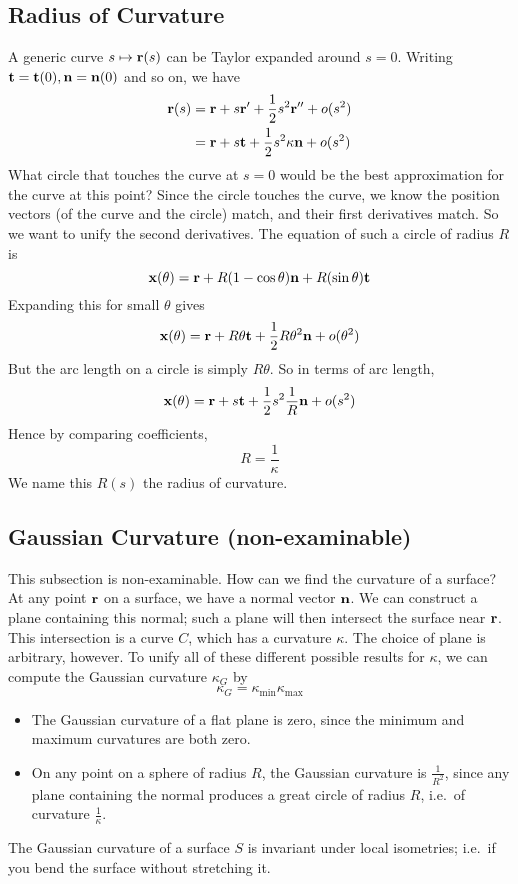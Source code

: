 \subsection{Radius of Curvature}
A generic curve \(s \mapsto \vb r(s)\) can be Taylor expanded around \(s=0\). Writing \(\vb t = \vb t(0), \vb n = \vb n(0)\) and so on, we have
\begin{align*}
	\vb r(s) & = \vb r + s\vb r' + \frac{1}{2}s^2 \vb r'' + o(s^2)    \\
	         & = \vb r + s\vb t + \frac{1}{2}s^2 \kappa\vb n + o(s^2)
\end{align*}
What circle that touches the curve at \(s=0\) would be the best approximation for the curve at this point? Since the circle touches the curve, we know the position vectors (of the curve and the circle) match, and their first derivatives match. So we want to unify the second derivatives. The equation of such a circle of radius \(R\) is
\[ \vb x(\theta) = \vb r + R(1 - \cos \theta)\vb n + R(\sin \theta) \vb t \]
Expanding this for small \(\theta\) gives
\[ \vb x(\theta) = \vb r + R\theta\vb t + \frac{1}{2} R\theta^2\vb n + o(\theta^2) \]
But the arc length on a circle is simply \(R\theta\). So in terms of arc length,
\[ \vb x(\theta) = \vb r + s\vb t + \frac{1}{2} s^2 \frac{1}{R}\vb n + o(s^2) \]
Hence by comparing coefficients,
\[ R = \frac{1}{\kappa} \]
We name this \(R(s)\) the radius of curvature.

\subsection{Gaussian Curvature (non-examinable)}
This subsection is non-examinable. How can we find the curvature of a surface? At any point \(\vb r\) on a surface, we have a normal vector \(\vb n\). We can construct a plane containing this normal; such a plane will then intersect the surface near \(\vb r\). This intersection is a curve \(C\), which has a curvature \(\kappa\). The choice of plane is arbitrary, however. To unify all of these different possible results for \(\kappa\), we can compute the Gaussian curvature \(\kappa_G\) by
\[ \kappa_G = \kappa_{\text{min}} \kappa_{\text{max}} \]
\begin{itemize}
	\item The Gaussian curvature of a flat plane is zero, since the minimum and maximum curvatures are both zero.
	\item On any point on a sphere of radius \(R\), the Gaussian curvature is \(\frac{1}{R^2}\), since any plane containing the normal produces a great circle of radius \(R\), i.e.\ of curvature \(\frac{1}{\kappa}\).
\end{itemize}

\begin{theorem}
	The Gaussian curvature of a surface \(S\) is invariant under local isometries; i.e.\ if you bend the surface without stretching it.
\end{theorem}

